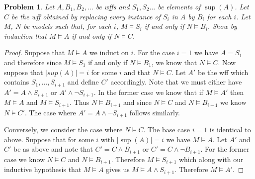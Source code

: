 \documentclass{article}
\newtheorem{problem}{Problem}
\begin{document}
\begin{problem}
Let $A, B_1, B_2, \dots$ be wffs and $S_1, S_2 \dots$ be elements of $\sup(A)$. Let $C$ be the wff obtained by replacing every instance of $S_i$ in $A$ by $B_i$ for each $i$. Let $M$, $N$ be models such that, for each $i$, $M \models S_i$ if and only if $N \models B_i$. Show by induction that $M \models A$ if and only if $N \models C$.
\end{problem}
\begin{proof}
Suppose that $M \models A$ we induct on $i$. For the case $i = 1$ we have $A = S_1$ and therefore since $M \models S_1$ if and only if $N \models B_1$, we know that $N \models C$. Now suppose that $|sup(A)| = i$ for some $i$ and that $N \models C$. Let $A'$ be the wff which contains $S_1, \dots , S_{i+1}$ and define $C'$ accordingly. Note that we must either have $A' = A \wedge S_{i+1}$ or $A' \wedge \neg S_{i+1}$. In the former case we know that if $M \models A'$ then $M \models A$ and $M \models S_{i+1}$. Thus $N \models B_{i+1}$ and since $N \models C$ and $N \models B_{i+1}$ we know $N \models C'$. The case where $A' = A \wedge \neg S_{i+1}$ follows similarly.

Conversely, we consider the case where $N \models C$. The base case $i = 1$ is identical to above. Suppose that for some $i$ with $|\sup(A)| = i$ we have $M \models A$. Let $A'$ and $C'$ be as above and note that $C' = C \wedge B_{i+1}$ or $C' = C \wedge \neg B_{i+1}$. For the former case we know $N \models C$ and $N \models B_{i+1}$. Therefore $M \models S_{i+1}$ which along with our inductive hypothesis that $M \models A$ gives us $M \models A \wedge S_{i+1}$. Therefore $M \models A'$.
\end{proof}
\end{document}
